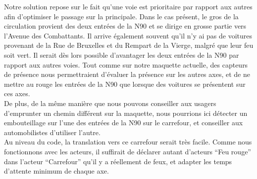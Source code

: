 Notre solution repose sur le fait qu’une voie est prioritaire par rapport aux autres afin d’optimiser le passage sur la principale. Dans le cas présent, le gros de la circulation provient des deux entrées de la N90 et se dirige en grosse partie vers l’Avenue des Combattants. Il arrive également souvent qu’il n’y ai pas de voitures provenant de la Rue de Bruxelles et du Rempart de la Vierge, malgré que leur feu soit vert. Il serait dès lors possible d’avantager les deux entrées de la N90 par rapport aux autres voies. Tout comme sur notre maquette actuelle, des capteurs de présence nous permettraient d’évaluer la présence sur les autres axes, et de ne mettre au rouge les entrées de la N90 que lorsque des voitures se présentent sur ces axes.\\

De plus, de la même manière que nous pouvons conseiller aux usagers d’emprunter un chemin différent sur la maquette, nous pourrions ici détecter un embouteillage sur l’une des entrées de la N90 sur le carrefour, et conseiller aux automobilistes d’utiliser l’autre.\\

Au niveau du code, la translation vers ce carrefour serait très facile. Comme nous fonctionnons avec les acteurs, il suffirait de déclarer autant d’acteurs “Feu rouge” dans l’acteur “Carrefour” qu’il y a réellement de feux, et adapter les temps d’attente minimum de chaque axe.